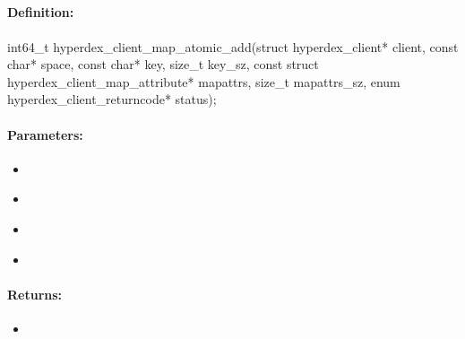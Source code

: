 \pagebreak
\subsection{}
\label{api:c:map_atomic_add}


\paragraph{Definition:}
\begin{ccode}
int64_t hyperdex_client_map_atomic_add(struct hyperdex_client* client,
        const char* space,
        const char* key, size_t key_sz,
        const struct hyperdex_client_map_attribute* mapattrs, size_t mapattrs_sz,
        enum hyperdex_client_returncode* status);
\end{ccode}

\paragraph{Parameters:}
\begin{itemize}[noitemsep]
\item {}\\

\item {}\\

\item {}\\

\item {}\\

\end{itemize}

\paragraph{Returns:}
\begin{itemize}[noitemsep]
\item {}\\

\end{itemize}

